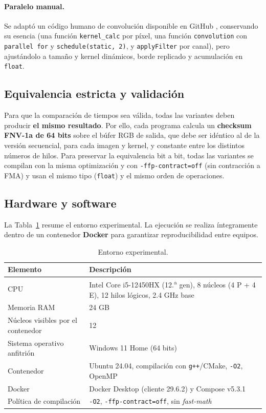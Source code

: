 \documentclass[12pt]{article}
\begin{document}
\paragraph{Paralelo manual.} Se adaptó un código humano de convolución
disponible en GitHub \cite{githubconv}, conservando su esencia (una función
\texttt{kernel\_calc} por píxel, una función \texttt{convolution} con
\texttt{parallel for} y \texttt{schedule(static, 2)}, y \texttt{applyFilter} por
canal), pero ajustándolo a tamaño y kernel dinámicos, borde replicado y
acumulación en \texttt{float}.

\subsection{Equivalencia estricta y validación}
\label{subsec:validacion}
Para que la comparación de tiempos sea válida, todas las variantes deben producir
\textbf{el mismo resultado}. Por ello, cada programa calcula un \textbf{checksum
FNV-1a de 64 bits} sobre el búfer RGB de salida, que debe ser idéntico al de la
versión secuencial, para cada imagen y kernel, y constante entre los distintos
números de hilos. Para preservar la equivalencia bit a bit, todas las variantes se
compilan con la misma optimización y con \texttt{-ffp-contract=off} (sin
contracción a FMA) y usan el mismo tipo (\texttt{float}) y el mismo orden de
operaciones.

\subsection{Hardware y software}
\label{subsec:entorno}
La Tabla~\ref{tab:entorno} resume el entorno experimental. La ejecución se realiza
íntegramente dentro de un contenedor \textbf{Docker} para garantizar
reproducibilidad entre equipos.

\begin{table}[H]
\centering
\caption{Entorno experimental.}
\label{tab:entorno}
\small
\begin{tabularx}{\linewidth}{@{}l X@{}}
\toprule
\textbf{Elemento} & \textbf{Descripción} \\
\midrule
CPU & Intel Core i5-12450HX (12.\textsuperscript{a} gen), 8 núcleos (4 P + 4 E), 12 hilos lógicos, 2.4 GHz base \\
Memoria RAM & 24 GB \\
Núcleos visibles por el contenedor & 12 \\
Sistema operativo anfitrión & Windows 11 Home (64 bits) \\
Contenedor & Ubuntu 24.04, compilación con \texttt{g++}/CMake, \texttt{-O2}, OpenMP \\
Docker & Docker Desktop (cliente 29.6.2) y Compose v5.3.1 \\
Política de compilación & \texttt{-O2}, \texttt{-ffp-contract=off}, sin \emph{fast-math} \\
\bottomrule
\end{tabularx}
\end{table}
\end{document}
